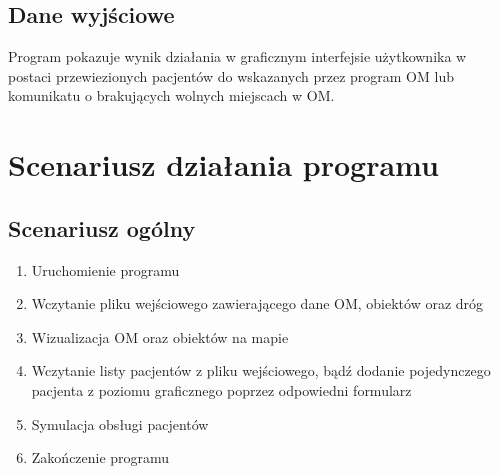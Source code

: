 \documentclass[]{article}
\begin{document}
    \subsection{Dane wyjściowe}
    Program pokazuje wynik działania w graficznym interfejsie użytkownika w postaci przewiezionych pacjentów do wskazanych przez program OM lub komunikatu o brakujących wolnych miejscach w OM.


    \section{Scenariusz działania programu}

    \subsection{Scenariusz ogólny}
    \begin{enumerate}
        \item Uruchomienie programu
        \item Wczytanie pliku wejściowego zawierającego dane OM, obiektów oraz dróg
        \item Wizualizacja OM oraz obiektów na mapie
        \item Wczytanie listy pacjentów z pliku wejściowego, bądź dodanie pojedynczego pacjenta z poziomu graficznego poprzez odpowiedni formularz
        \item Symulacja obsługi pacjentów
        \item Zakończenie programu
    \end{enumerate}
\end{document}
